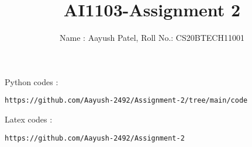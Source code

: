 \documentclass[journal,12pt,twocolumn]{IEEEtran}
\DeclareMathOperator*{\Res}{Res}
\begin{document}
\newcommand{\BEQA}{\begin{eqnarray}}
\newcommand{\EEQA}{\end{eqnarray}}
\newcommand{\define}{\stackrel{\triangle}{=}}

\raggedbottom
\setlength{\parindent}{0pt}
\providecommand{\mbf}{\mathbf}
\providecommand{\pr}[1]{\ensuremath{\Pr\left(#1\right)}}
\providecommand{\qfunc}[1]{\ensuremath{Q\left(#1\right)}}
\providecommand{\sbrak}[1]{\ensuremath{{}\left[#1\right]}}
\providecommand{\lsbrak}[1]{\ensuremath{{}\left[#1\right.}}
\providecommand{\rsbrak}[1]{\ensuremath{{}\left.#1\right]}}
\providecommand{\brak}[1]{\ensuremath{\left(#1\right)}}
\providecommand{\lbrak}[1]{\ensuremath{\left(#1\right.}}
\providecommand{\rbrak}[1]{\ensuremath{\left.#1\right)}}
\providecommand{\cbrak}[1]{\ensuremath{\left\{#1\right\}}}
\providecommand{\lcbrak}[1]{\ensuremath{\left\{#1\right.}}
\providecommand{\rcbrak}[1]{\ensuremath{\left.#1\right\}}}
\theoremstyle{remark}
\newtheorem{rem}{Remark}
\newcommand{\sgn}{\mathop{\mathrm{sgn}}}
\providecommand{\abs}[1]{\vert#1\vert}
\providecommand{\res}[1]{\Res\displaylimits_{#1}} 
\providecommand{\norm}[1]{\lVert#1\rVert}
\providecommand{\mtx}[1]{\mathbf{#1}}
\providecommand{\mean}[1]{E[ #1 ]}
\providecommand{\fourier}{\overset{\mathcal{F}}{ \rightleftharpoons}}
\providecommand{\system}{\overset{\mathcal{H}}{ \longleftrightarrow}}
\newcommand{\solution}{\noindent \textbf{Solution: }}
\newcommand{\cosec}{\,\text{cosec}\,}
\providecommand{\dec}[2]{\ensuremath{\overset{#1}{\underset{#2}{\gtrless}}}}
\newcommand{\myvec}[1]{\ensuremath{\begin{pmatrix}#1\end{pmatrix}}}
\newcommand{\mydet}[1]{\ensuremath{\begin{vmatrix}#1\end{vmatrix}}}
\makeatletter
{}
\makeatother
\let\StandardTheFigure\thefigure
\let\vec\mathbf
\renewcommand{\thefigure}{\theproblem}
\def\putbox#1#2#3{\makebox[0in][l]{\makebox[#1][l]{}\raisebox{\baselineskip}[0in][0in]{\raisebox{#2}[0in][0in]{#3}}}}
     \def\rightbox#1{\makebox[0in][r]{#1}}
     \def\centbox#1{\makebox[0in]{#1}}
     \def\topbox#1{\raisebox{-\baselineskip}[0in][0in]{#1}}
     \def\midbox#1{\raisebox{-0.5\baselineskip}[0in][0in]{#1}}
\vspace{3cm}
\title{AI1103-Assignment 2}
\author{Name : Aayush Patel, Roll No.: CS20BTECH11001}
\maketitle
\newpage
\bigskip
\renewcommand{\thefigure}{\theenumi}
\renewcommand{\thetable}{\theenumi}
Python codes : 
\begin{lstlisting}
https://github.com/Aayush-2492/Assignment-2/tree/main/code
\end{lstlisting}
%
Latex codes : 
%
\begin{lstlisting}
https://github.com/Aayush-2492/Assignment-2
\end{lstlisting}
\end{document}

